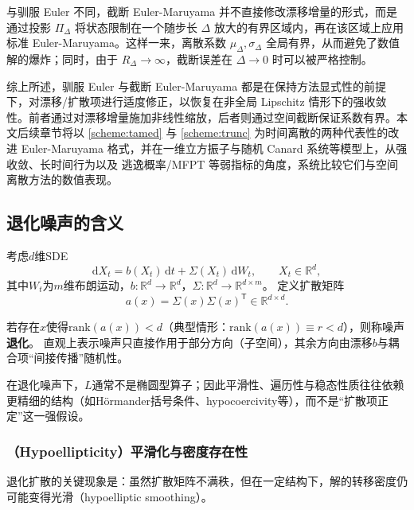 	与驯服 Euler 不同，截断 Euler-Maruyama 并不直接修改漂移增量的形式，而是通过投影 $\Pi_\Delta$ 将状态限制在一个随步长 $\Delta$ 放大的有界区域内，再在该区域上应用标准 Euler-Maruyama。这样一来，离散系数 $\mu_\Delta,\sigma_\Delta$ 全局有界，从而避免了数值解的爆炸；同时，由于 $R_\Delta\to\infty$，截断误差在 $\Delta\to0$ 时可以被严格控制。
	
	\medskip
	
	综上所述，驯服 Euler 与截断 Euler-Maruyama 都是在保持方法显式性的前提下，对漂移/扩散项进行适度修正，以恢复在非全局 Lipschitz 情形下的强收敛性。前者通过对漂移增量施加非线性缩放，后者则通过空间截断保证系数有界。本文后续章节将以 \eqref{scheme:tamed} 与 \eqref{scheme:trunc} 为时间离散的两种代表性的改进 Euler-Maruyama 格式，并在一维立方振子与随机 Canard 系统等模型上，从强收敛、长时间行为以及 逃逸概率/MFPT 等弱指标的角度，系统比较它们与空间离散方法的数值表现。
	
	
	
	\subsection{退化噪声的含义}
	
	考虑$d$维SDE
	\begin{equation}
		\mathrm{d}X_t = b(X_t)\,\mathrm{d}t + \Sigma(X_t)\,\mathrm{d}W_t,\qquad X_t\in\mathbb{R}^d,
	\end{equation}
	其中$W_t$为$m$维布朗运动，$b:\mathbb{R}^d\to\mathbb{R}^d$，$\Sigma:\mathbb{R}^d\to\mathbb{R}^{d\times m}$。
	定义扩散矩阵
	\[
	a(x)=\Sigma(x)\Sigma(x)^{\mathsf T}\in\mathbb{R}^{d\times d}.
	\]
	
	\begin{definition}[退化噪声]
		若存在$x$使得$\mathrm{rank}(a(x))<d$（典型情形：$\mathrm{rank}(a(x))\equiv r<d$），则称噪声\textbf{退化}。
		直观上表示噪声只直接作用于部分方向（子空间），其余方向由漂移$b$与耦合项“间接传播”随机性。
	\end{definition}
	

	在退化噪声下，$L$通常不是椭圆型算子；因此平滑性、遍历性与稳态性质往往依赖更精细的结构（如H\"ormander括号条件、hypocoercivity等），而不是“扩散项正定”这一强假设。

	
	\subsubsection{（Hypoellipticity）平滑化与密度存在性}
	
	退化扩散的关键现象是：虽然扩散矩阵不满秩，但在一定结构下，解的转移密度仍可能变得光滑（hypoelliptic smoothing）。
	
